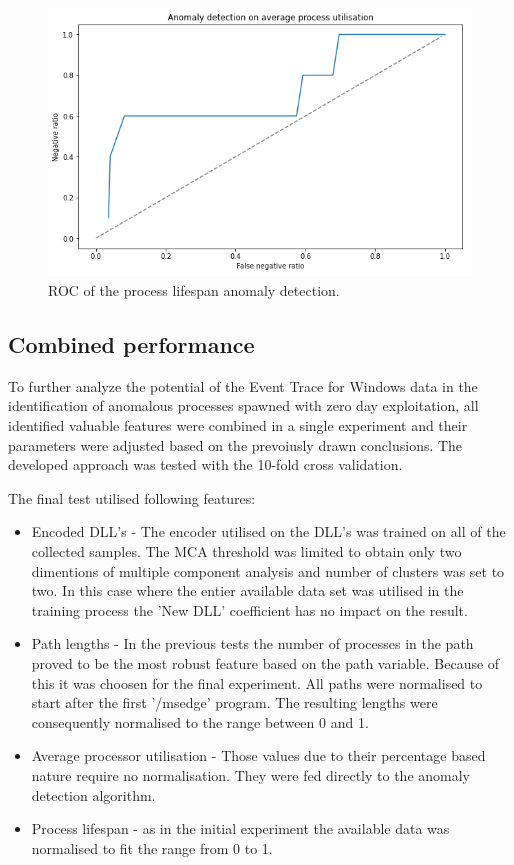 \documentclass[a4paper,twoside,12pt]{book}
\begin{document}
\begin{figure}
	\centering
	\includegraphics[scale=0.9]{images/ROClifespan.PNG}
	\caption{ROC of the process lifespan anomaly detection.}
	\label{fig:lifespanROC}
 \end{figure}

\subsection{Combined performance}

To further analyze the potential of the Event Trace for Windows data in the identification of
anomalous processes spawned with zero day exploitation, all identified valuable features were
combined in a single experiment and their parameters were adjusted based on the prevoiusly drawn 
conclusions. The developed approach was tested with the 10-fold cross validation.

The final test utilised following features:
\begin{itemize}
	\item Encoded DLL's - The encoder utilised on the DLL's was trained on all of the collected samples. The MCA 
	threshold was limited to obtain only two dimentions of multiple component analysis and number of clusters was set 
	to two. In this case where the entier available data set was utilised in the training process the 'New DLL'
	coefficient has no impact on the result.  
	\item Path lengths - In the previous tests the number of processes in the path proved to be the most robust feature
	based on the path variable. Because of this it was choosen for the final experiment. All paths were normalised to start
	after the first '/msedge' program. The resulting lengths were consequently normalised to the range between 0 and 1.
	\item Average processor utilisation - Those values due to their percentage based nature require no normalisation. They 
	were fed directly to the anomaly detection algorithm. 
	\item Process lifespan - as in the initial experiment the available data was normalised to fit the range from 0 to 1.
\end{itemize}
\end{document}
